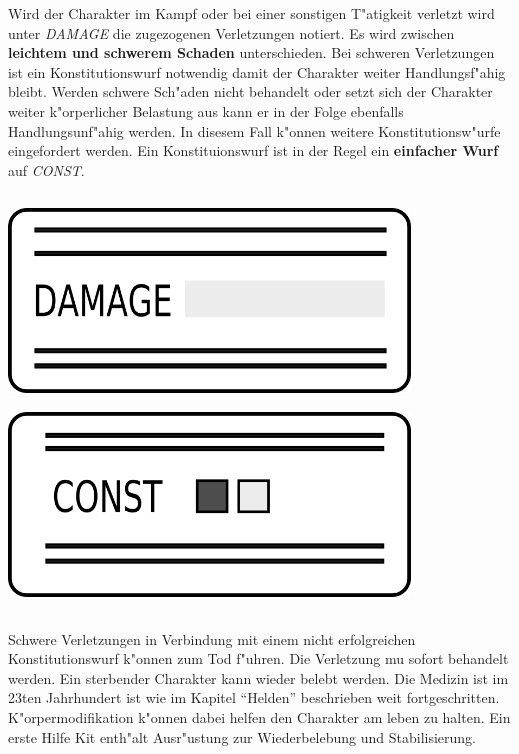 \begin{column}[l]{0.58}
    Wird der Charakter im Kampf oder bei einer sonstigen T"atigkeit verletzt wird unter \emph{DAMAGE} die zugezogenen Verletzungen notiert. 
    Es wird zwischen \textbf{leichtem und schwerem Schaden} unterschieden. Bei schweren Verletzungen ist ein Konstitutionswurf notwendig damit der Charakter weiter Handlungsf"ahig bleibt. Werden schwere Sch"aden nicht behandelt oder setzt sich der Charakter weiter k"orperlicher Belastung aus kann er in der Folge ebenfalls Handlungsunf"ahig werden. In disesem Fall k"onnen weitere Konstitutionsw"urfe eingefordert werden. Ein Konstituionswurf ist in der Regel ein \textbf{einfacher Wurf} auf \emph{CONST}.
\end{column}
\begin{column}[r]{0.42}
    \centering
    \includegraphics[width=0.80\textwidth]{images/character_damage}

    \includegraphics[width=0.80\textwidth]{images/character_const}
\end{column}
\smallskip

Schwere Verletzungen in Verbindung mit einem nicht erfolgreichen Konstitutionswurf k"onnen zum Tod f"uhren. Die Verletzung mu\3 sofort behandelt werden. Ein sterbender Charakter kann wieder belebt werden. Die Medizin ist im 23ten Jahrhundert ist wie im Kapitel "`Helden"' beschrieben weit fortgeschritten. K"orpermodifikation k"onnen dabei helfen den Charakter am leben zu halten. Ein erste Hilfe Kit enth"alt Ausr"ustung zur Wiederbelebung und Stabilisierung.


